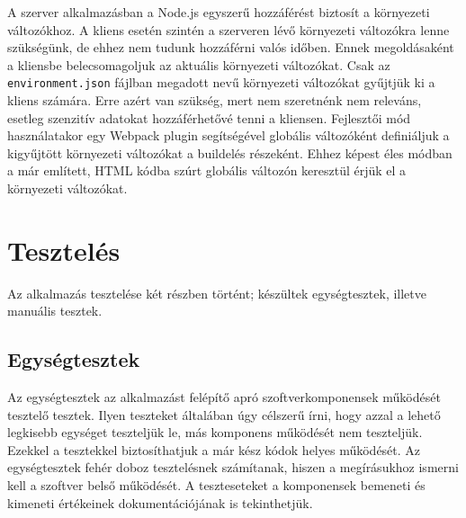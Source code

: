 \documentclass{elteikthesis}
\begin{document}
				A szerver alkalmazásban a Node.js egyszerű hozzáférést biztosít a környezeti változókhoz. A kliens esetén szintén a szerveren lévő környezeti változókra lenne szükségünk, de ehhez nem tudunk hozzáférni valós időben. Ennek megoldásaként a kliensbe belecsomagoljuk az aktuális környezeti változókat. Csak az \texttt{environment.json} fájlban megadott nevű környezeti változókat gyűjtjük ki a kliens számára. Erre azért van szükség, mert nem szeretnénk nem releváns, esetleg szenzitív adatokat hozzáférhetővé tenni a kliensen. Fejlesztői mód használatakor egy Webpack plugin segítségével globális változóként definiáljuk a kigyűjtött környezeti változókat a buildelés részeként. Ehhez képest éles módban a már említett, HTML kódba szúrt globális változón keresztül érjük el a környezeti változókat.
		
		\section{Tesztelés}
			Az alkalmazás tesztelése két részben történt; készültek egységtesztek, illetve manuális tesztek.

			\subsection{Egységtesztek}
				Az egységtesztek \cite{unittesting} az alkalmazást felépítő apró szoftverkomponensek működését tesztelő tesztek. Ilyen teszteket általában úgy célszerű írni, hogy azzal a lehető legkisebb egységet teszteljük le, más komponens működését nem teszteljük. Ezekkel a tesztekkel biztosíthatjuk a már kész kódok helyes működését. Az egységtesztek fehér doboz tesztelésnek számítanak, hiszen a megírásukhoz ismerni kell a szoftver belső működését. A teszteseteket a komponensek bemeneti és kimeneti értékeinek dokumentációjának is tekinthetjük. 
\end{document}
